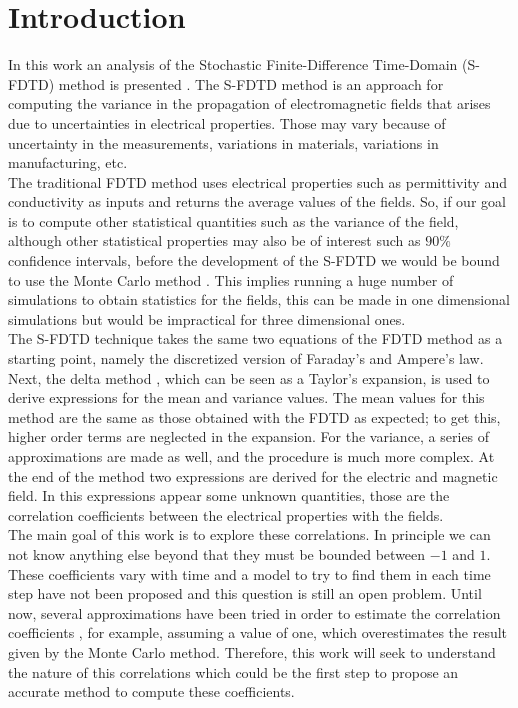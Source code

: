 \documentclass[12pt, oneside]{book}
\begin{document}
\chapter{Introduction}
In this work an analysis of the Stochastic Finite-Difference Time-Domain (S-FDTD) method is presented \cite{smith2011stochastic,smith2012stochastic}. The S-FDTD method is an approach for computing the variance in the propagation of electromagnetic fields that arises due to uncertainties in electrical properties. Those may vary because of uncertainty in the measurements, variations in materials, variations in manufacturing, etc. \\
\indent The traditional FDTD method \cite{taflove2005computational} uses electrical properties such as permittivity and conductivity as inputs and returns the average values of the fields. So, if our goal is to compute other statistical quantities such as the variance of the field, although other statistical properties may also be of interest such as $90\%$ confidence intervals, before the development of the S-FDTD we would be bound to use the Monte Carlo method \cite{Sadiku2009}. This implies running a huge number of simulations to obtain statistics for the fields, this can be made in one dimensional simulations but would be impractical for three dimensional ones.\\
\indent The S-FDTD technique takes the same two equations of the FDTD method as a starting point, namely the discretized version of Faraday's and Ampere's law. Next, the delta method \cite{casella2021statistical}, which can be seen as a Taylor's expansion, is used to derive expressions for the mean and variance values. The mean values for this method are the same as those obtained with the FDTD as expected; to get this, higher order terms are neglected in the expansion. For the variance, a series of approximations are made as well, and the procedure is much more complex. At the end of the method two expressions are derived for the electric and magnetic field. In this expressions appear some unknown quantities, those are the correlation coefficients between the electrical properties with the fields. \\
\indent The main goal of this work is to explore these correlations. In principle we can not know anything else beyond that they must be bounded between $-1$ and $1$. These coefficients vary with time and a model to try to find them in each time step have not been proposed and this question is still an open problem. Until now, several approximations have been tried in order to estimate the correlation coefficients \cite{Zygiridis2017}, for example, assuming a value of one, which overestimates the result given by the Monte Carlo method. Therefore, this work will seek to understand the nature of this correlations which could be the first step to propose an accurate method to compute these coefficients. \\
\end{document}
